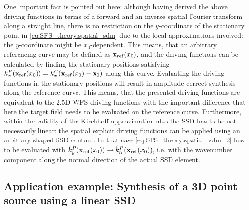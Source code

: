 One important fact is pointed out here: although having derived the above driving functions in terms of a forward and an inverse spatial Fourier transform along a straight line, there is no restriction on the $y$-coordinate of the stationary point in \eqref{eq:SFS_theory:spatial_sdm} due to the local approximations involved: the $y$-coordinate might be $x_0$-dependent.
This means, that an arbitrary referencing curve may be defined as $\mathbf{x}_{\mathrm{ref}}(x_0)$, and the driving functions can be calculated by finding the stationary positions 
satisfying $k_x^P(\mathbf{x}_{\mathrm{ref}}(x_0)) = k_x^G(\mathbf{x}_{\mathrm{ref}}(x_0) - \mathbf{x}_0)$ along this curve.
Evaluating the driving functions in the stationary positions will result in amplitude correct synthesis along the reference curve. 
This means, that the presented driving functions are equivalent to the 2.5D WFS driving functions with the important difference that here the target field needs to be evaluated on the reference curve.
Furthermore, within the validity of the Kirchhoff-approximation also the SSD has to be not necessarily linear: the spatial explicit driving functions can be applied using an arbitrary shaped SSD contour.
In that case \eqref{eq:SFS_theory:spatial_sdm_2} has to be evaluated with $\hat{k}_y^{P}(\mathbf{x}_{\mathrm{ref}}(x_0)) \rightarrow \hat{k}_{\mathrm{n}}^{P}(\mathbf{x}_{\mathrm{ref}}(x_0))$, i.e. with the wavenumber component along the normal direction of the actual SSD element.

\subsection*{Application example: Synthesis of a 3D point source using a linear SSD}

